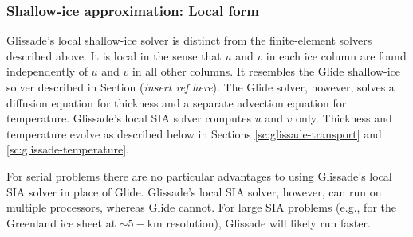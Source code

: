 \subsubsection{Shallow-ice approximation: Local form}

Glissade's local shallow-ice solver is distinct from the finite-element solvers described above.
It is local in the sense that $u$ and $v$ in each ice column are found independently
of $u$ and $v$ in all other columns.
It resembles the Glide shallow-ice solver described in Section (\textit{insert ref here}).
The Glide solver, however, solves a diffusion equation for thickness and a separate advection
equation for temperature.  Glissade's local SIA solver computes $u$ and $v$ only.
Thickness and temperature evolve as described below in Sections \ref{sc:glissade-transport}
and \ref{sc:glissade-temperature}.

For serial problems there are no particular advantages to using Glissade's local SIA solver 
in place of Glide.  Glissade's local SIA solver, however, can run on multiple processors, 
whereas Glide cannot.  For large SIA problems (e.g., for the Greenland
ice sheet at $\sim 5-\text{km}$ resolution), Glissade will likely run faster.


